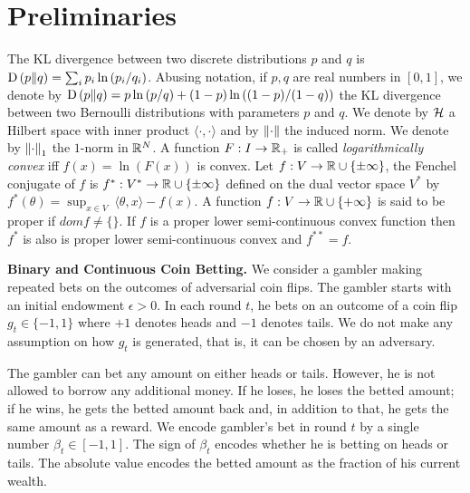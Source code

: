 \section{Preliminaries}
\label{sec:prel}

The \ac{KL} divergence between two discrete distributions $p$ and $q$
is $\operatorname*{D}\left({p}\middle\|{q}\right) = \sum_{i} p_i \ln\left( p_i/q_i \right)$. Abusing
notation, if $p,q$ are real numbers in $[0,1]$, we denote by $\operatorname*{D}\left({p}\middle\|{q}\right) = p \ln
\left(p/q \right) + (1-p) \ln \left((1-p)/(1-q) \right)$ the
\ac{KL} divergence between two Bernoulli distributions with parameters
$p$ and $q$.  We denote by $\mathcal{H}$ a Hilbert space with inner product $\langle
\cdot, \cdot\rangle$ and by $\left\|{\cdot}\right\|$ the induced norm.  We denote by
$\left\|{\cdot}\right\|_1$ the $1$-norm in $\mathbb{R}^N$.  A function $F:I \to \mathbb{R}_+$ is called
\emph{logarithmically convex} iff $f(x) = \ln(F(x))$ is convex.
Let $f:V \to \mathbb{R} \cup \{\pm\infty\}$, the Fenchel conjugate of $f$ is $f^*:V^* \to \mathbb{R} \cup \{\pm
\infty\}$ defined on the dual vector space $V^*$ by $f^*(\theta) = \sup_{x \in
V} \ \langle \theta, x \rangle - f(x)$.  A function $f:V \to \mathbb{R} \cup \{+
\infty\}$ is said to be proper if $dom f \neq \{\}$. If $f$ is a proper lower semi-continuous convex
function then $f^*$ is also is proper lower semi-continuous convex and
$f^{**}=f$.

\textbf{Binary and Continuous Coin Betting.} We consider a gambler making
repeated bets on the outcomes of adversarial coin flips. The gambler starts with an
initial endowment $\epsilon > 0$. In each round $t$, he bets on an outcome of a
coin flip $g_t \in \{-1,1\}$ where $+1$ denotes heads and $-1$ denotes tails.
We do not make any assumption on how $g_t$ is generated, that is, it can be
chosen by an adversary.

The gambler can bet any amount on either heads or tails. However, he is not
allowed to borrow any additional money. If he loses, he loses the betted amount; if he wins, he gets the betted amount back and, in addition to that, he
gets the same amount as a reward.  We encode gambler's bet in round $t$ by a
single number $\beta_t \in [-1,1]$. The sign of $\beta_t$ encodes whether he is
betting on heads or tails. The absolute value encodes the betted amount as the
fraction of his current wealth.

